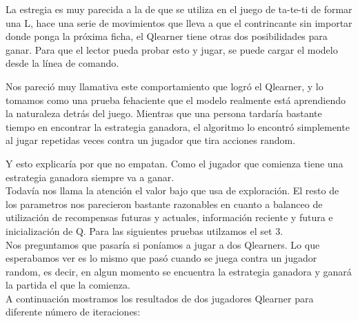 La estregia es muy parecida a la de que se utiliza en el juego de ta-te-ti de formar una L, hace una serie de movimientos que lleva a que el contrincante sin importar donde ponga la pr\'oxima ficha, el Qlearner tiene otras dos posibilidades para ganar. Para que el lector pueda probar esto y jugar, se puede cargar el modelo desde la l\'inea de comando.

Nos pareci\'o muy llamativa este comportamiento que logr\'o el Qlearner, y lo tomamos como una prueba fehaciente que el modelo realmente est\'a aprendiendo la naturaleza detr\'as del juego. Mientras que una persona tardar\'ia bastante tiempo en encontrar la estrategia ganadora, el algoritmo lo encontr\'o simplemente al jugar repetidas veces contra un jugador que tira acciones random.

Y esto explicaría por que no empatan. Como el jugador que comienza tiene una estrategia ganadora siempre va a ganar.\\

Todavía nos llama la atención el valor bajo que usa de exploración. El resto de los parametros nos parecieron bastante razonables en cuanto a balanceo de utilización de recompensas futuras y actuales, información reciente y futura e inicialización de Q.
Para las siguientes pruebas utilzamos el set 3.\\

Nos preguntamos que pasaría si poníamos a jugar a dos Qlearners. Lo que esperabamos ver es lo mismo que pasó cuando se juega contra un jugador random, es decir, en algun momento se encuentra la estrategia ganadora y ganará la partida el que la comienza.\\

A continuación mostramos los resultados de dos jugadores Qlearner para diferente número de iteraciones:


